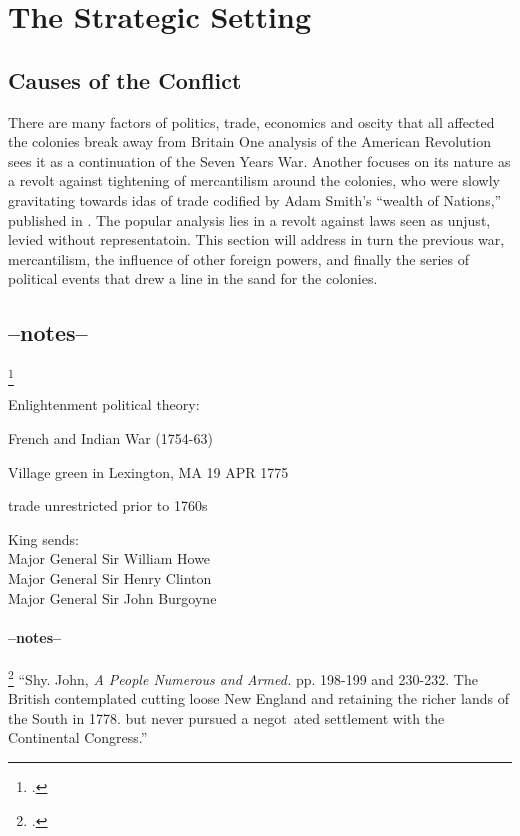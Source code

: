 \section{The Strategic Setting}

\subsection{Causes of the Conflict}

There are many factors of politics, trade, economics and oscity that all
affected the colonies break away from Britain One analysis of the American
Revolution sees it as a continuation of the Seven Years War. Another focuses on
its nature as a revolt against tightening of mercantilism around the colonies,
who were slowly gravitating towards idas of trade codified by Adam Smith's
``wealth of Nations,'' published in . The popular analysis lies in a
revolt against laws seen as unjust, levied without representatoin. This section
will address in turn the previous war, mercantilism, the influence of other
foreign powers, and finally the series of political events that drew a line in
the sand for the colonies.

\subsection{--notes--}\footcite[2]{moncure_cowpens_1996}

Enlightenment political theory:

French and Indian War (1754-63)

Village green in Lexington, MA 19 APR 1775

trade unrestricted prior to 1760s

King sends:\\
Major General Sir William Howe\\
Major General Sir Henry Clinton\\
Major General Sir John Burgoyne

\paragraph{--notes--}\footcite[]{}
``Shy. John, \emph{A People Numerous and Armed.} pp. 198-199 and 230-232. The British contemplated cutting loose New England and retaining the richer lands of the South in 1778. but never pursued a negot~ated settlement with the Continental Congress.''


